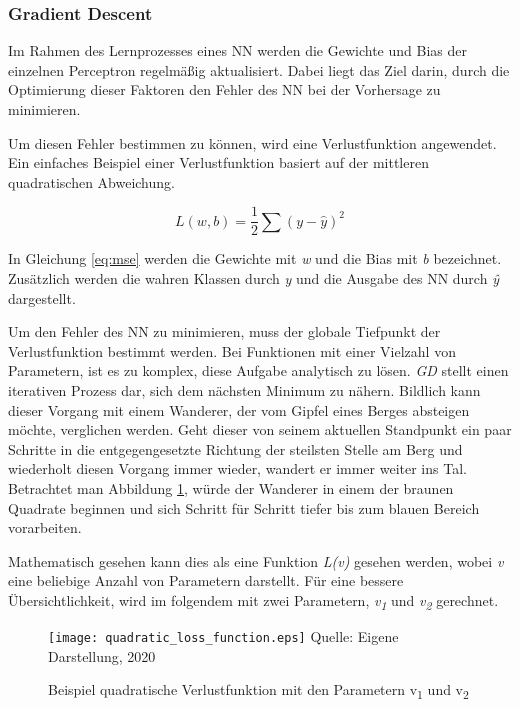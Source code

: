 \subsubsection{Gradient Descent}
Im Rahmen des Lernprozesses eines \ac{NN} werden die Gewichte und Bias der einzelnen Perceptron regelmäßig aktualisiert. Dabei liegt das Ziel darin, durch die Optimierung dieser Faktoren den Fehler des \ac{NN} bei der Vorhersage zu minimieren.

Um diesen Fehler bestimmen zu können, wird eine Verlustfunktion angewendet. Ein einfaches Beispiel einer Verlustfunktion basiert auf der mittleren quadratischen Abweichung.

\begin{equation} \label{eq:mse}
    L(w,b) = \frac{1}{2} \sum (y-\hat{y})^2
\end{equation}

In Gleichung \ref{eq:mse} werden die Gewichte mit \textit{w} und die Bias mit \textit{b} bezeichnet. Zusätzlich werden die wahren Klassen durch \textit{y} und die Ausgabe des \ac{NN} durch \textit{\^{y}} dargestellt. 


Um den Fehler des \ac{NN} zu minimieren, muss der globale Tiefpunkt der Verlustfunktion bestimmt werden. Bei Funktionen mit einer Vielzahl von Parametern, ist es zu komplex, diese Aufgabe analytisch zu lösen. \textit{\ac{GD}} stellt einen iterativen Prozess dar, sich dem nächsten Minimum zu nähern. Bildlich kann dieser Vorgang mit einem Wanderer, der vom Gipfel eines Berges absteigen möchte, verglichen werden. Geht dieser von seinem aktuellen Standpunkt ein paar Schritte in die entgegengesetzte Richtung der steilsten Stelle am Berg und wiederholt diesen Vorgang immer wieder, wandert er immer weiter ins Tal. Betrachtet man Abbildung \ref{fig:quadLoss}, würde der Wanderer in einem der braunen Quadrate beginnen und sich Schritt für Schritt tiefer bis zum blauen Bereich vorarbeiten. 

Mathematisch gesehen kann dies als eine Funktion \textit{L(v)} gesehen werden, wobei \textit{v} eine beliebige Anzahl von Parametern darstellt. Für eine bessere Übersichtlichkeit, wird im folgendem mit zwei Parametern, \textit{v\textsubscript{1}} und \textit{v\textsubscript{2}} gerechnet.

\begin{figure}[t]
    \centering
    \caption[]{Beispiel quadratische Verlustfunktion mit den Parametern v\textsubscript{1} und v\textsubscript{2}}
	\label{fig:quadLoss}
    \texttt{[image: quadratic\_loss\_function.eps]}
    Quelle: Eigene Darstellung, 2020
\end{figure}

